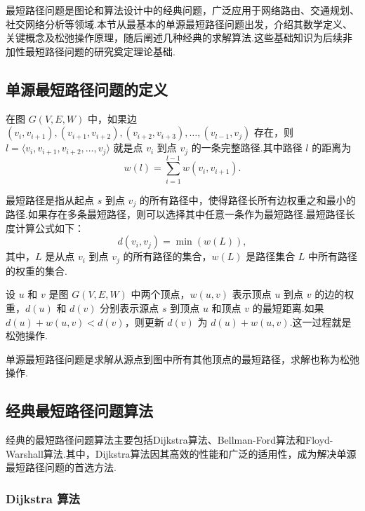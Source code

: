 最短路径问题是图论和算法设计中的经典问题，广泛应用于网络路由、交通规划、社交网络分析等领域.本节从最基本的单源最短路径问题出发，介绍其数学定义、关键概念及松弛操作原理，随后阐述几种经典的求解算法.这些基础知识为后续非加性最短路径问题的研究奠定理论基础.

\subsection{单源最短路径问题的定义}

\begin{definition}
在图 $G(V, E, W)$ 中，如果边 $(v_i, v_{i+1}), (v_{i+1}, v_{i+2}), (v_{i+2}, v_{i+3}), \ldots, (v_{l-1}, v_j)$ 存在，则 $l = \langle v_i, v_{i+1}, v_{i+2}, \ldots, v_j \rangle$ 就是点 $v_i$ 到点 $v_j$ 的一条完整路径.其中路径 $l$ 的距离为
\[
w(l) = \sum_{i=1}^{l-1} w(v_i, v_{i+1}).
\]
\end{definition}

\begin{definition}
最短路径是指从起点 $s$ 到点 $v_j$ 的所有路径中，使得路径长所有边权重之和最小的路径.如果存在多条最短路径，则可以选择其中任意一条作为最短路径.最短路径长度计算公式如下：
\[
d(v_i, v_j) = \min(w(L)),
\]
其中，$L$ 是从点 $v_i$ 到点 $v_j$ 的所有路径的集合，$w(L)$ 是路径集合 $L$ 中所有路径的权重的集合.
\end{definition}

\begin{definition}
设 $u$ 和 $v$ 是图 $G(V, E, W)$ 中两个顶点，$w(u,v)$ 表示顶点 $u$ 到点 $v$ 的边的权重，$d(u)$ 和 $d(v)$ 分别表示源点 $s$ 到顶点 $u$ 和顶点 $v$ 的最短距离.如果 $d(u) + w(u,v) < d(v)$，则更新 $d(v)$ 为 $d(u) + w(u,v)$.这一过程就是松弛操作.
\end{definition}

单源最短路径问题是求解从源点到图中所有其他顶点的最短路径，求解也称为松弛操作.

\subsection{经典最短路径问题算法}

经典的最短路径问题算法主要包括Dijkstra算法、Bellman-Ford算法和Floyd-Warshall算法.其中，Dijkstra算法因其高效的性能和广泛的适用性，成为解决单源最短路径问题的首选方法.

\subsubsection{Dijkstra 算法}

